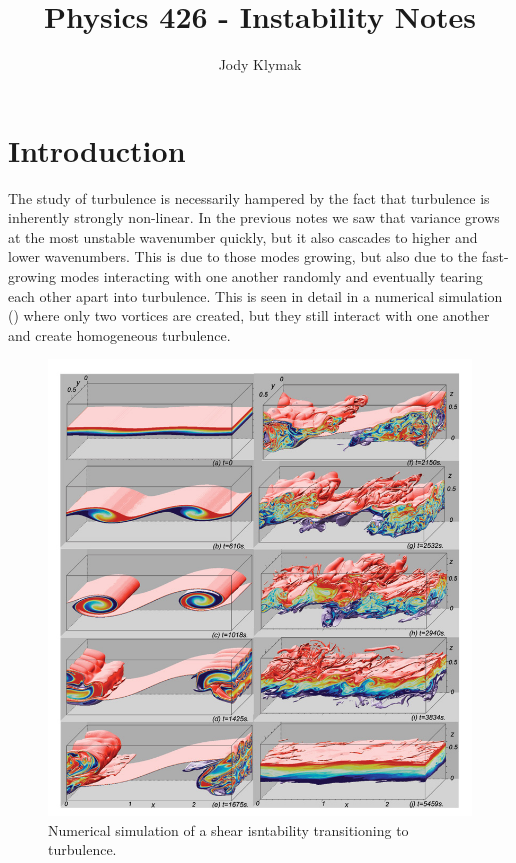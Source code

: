 \documentclass[11pt]{article}
\title{Physics 426 - Instability Notes}
\author{Jody Klymak}
\begin{document}
\maketitle
\pagestyle{fancy}

\section{Introduction}

The study of turbulence is necessarily hampered by the fact that turbulence is inherently strongly non-linear.  In the previous notes we saw that variance grows at the most unstable wavenumber quickly, but it also cascades to higher and lower wavenumbers.  This is due to those modes growing, but also due to the fast-growing modes interacting with one another randomly and eventually tearing each other apart into turbulence.  This is seen in detail in a numerical simulation () where only two vortices are created, but they still interact with one another and create  homogeneous turbulence.  

\begin{figure}[hbtp]
  \begin{center}\includegraphics[width=5in]{images/SmythEtAl05}
    \caption{Numerical simulation \citep{smythetal05} of a shear isntability transitioning to turbulence.}
    \label{fig:SmythEtAl05}
  \end{center}
\end{figure}
\end{document}
